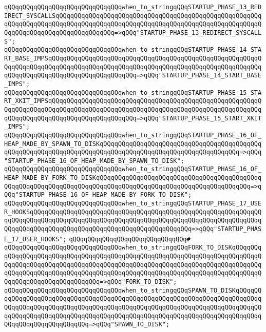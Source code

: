 \verb|qQQqqQQqqQQqqQQqqQQqqQQqqQQqqQQqwhen_to_stringqQQqSTARTUP_PHASE_13_REDIRECT_SYSCALLSqQQqqQQqqQQqqQQqqQQqqQQqqQQqqQQqqQQqqQQqqQQqqQQqqQQqqQQqqQQqqQQqqQQqqQQqqQQqqQQqqQQqqQQqqQQqqQQqqQQqqQQqqQQqqQQqqQQqqQQqqQQqqQQqqQQqqQQqqQQqqQQqqQQqqQQqqQQq=>qQQq"STARTUP_PHASE_13_REDIRECT_SYSCALLS";|\newline
\verb|qQQqqQQqqQQqqQQqqQQqqQQqqQQqqQQqwhen_to_stringqQQqSTARTUP_PHASE_14_START_BASE_IMPSqQQqqQQqqQQqqQQqqQQqqQQqqQQqqQQqqQQqqQQqqQQqqQQqqQQqqQQqqQQqqQQqqQQqqQQqqQQqqQQqqQQqqQQqqQQqqQQqqQQqqQQqqQQqqQQqqQQqqQQqqQQqqQQqqQQqqQQqqQQqqQQqqQQqqQQqqQQqqQQqqQQq=>qQQq"STARTUP_PHASE_14_START_BASE_IMPS";|\newline
\verb|qQQqqQQqqQQqqQQqqQQqqQQqqQQqqQQqwhen_to_stringqQQqSTARTUP_PHASE_15_START_XKIT_IMPSqQQqqQQqqQQqqQQqqQQqqQQqqQQqqQQqqQQqqQQqqQQqqQQqqQQqqQQqqQQqqQQqqQQqqQQqqQQqqQQqqQQqqQQqqQQqqQQqqQQqqQQqqQQqqQQqqQQqqQQqqQQqqQQqqQQqqQQqqQQqqQQqqQQqqQQqqQQqqQQqqQQq=>qQQq"STARTUP_PHASE_15_START_XKIT_IMPS";|\newline
\verb|qQQqqQQqqQQqqQQqqQQqqQQqqQQqqQQqwhen_to_stringqQQqSTARTUP_PHASE_16_OF_HEAP_MADE_BY_SPAWN_TO_DISKqQQqqQQqqQQqqQQqqQQqqQQqqQQqqQQqqQQqqQQqqQQqqQQqqQQqqQQqqQQqqQQqqQQqqQQqqQQqqQQqqQQqqQQqqQQqqQQqqQQqqQQqqQQq=>qQQq"STARTUP_PHASE_16_OF_HEAP_MADE_BY_SPAWN_TO_DISK";|\newline
\verb|qQQqqQQqqQQqqQQqqQQqqQQqqQQqqQQqwhen_to_stringqQQqSTARTUP_PHASE_16_OF_HEAP_MADE_BY_FORK_TO_DISKqQQqqQQqqQQqqQQqqQQqqQQqqQQqqQQqqQQqqQQqqQQqqQQqqQQqqQQqqQQqqQQqqQQqqQQqqQQqqQQqqQQqqQQqqQQqqQQqqQQqqQQqqQQqqQQq=>qQQq"STARTUP_PHASE_16_OF_HEAP_MADE_BY_FORK_TO_DISK";|\newline
\verb|qQQqqQQqqQQqqQQqqQQqqQQqqQQqqQQqwhen_to_stringqQQqSTARTUP_PHASE_17_USER_HOOKSqQQqqQQqqQQqqQQqqQQqqQQqqQQqqQQqqQQqqQQqqQQqqQQqqQQqqQQqqQQqqQQqqQQqqQQqqQQqqQQqqQQqqQQqqQQqqQQqqQQqqQQqqQQqqQQqqQQqqQQqqQQqqQQqqQQqqQQqqQQqqQQqqQQqqQQqqQQqqQQqqQQqqQQqqQQqqQQqqQQqqQQq=>qQQq"STARTUP_PHASE_17_USER_HOOKS";|\newline
\verb|qQQqqQQqqQQqqQQqqQQqqQQqqQQqqQQq#|\newline
\verb|qQQqqQQqqQQqqQQqqQQqqQQqqQQqqQQqwhen_to_stringqQQqFORK_TO_DISKqQQqqQQqqQQqqQQqqQQqqQQqqQQqqQQqqQQqqQQqqQQqqQQqqQQqqQQqqQQqqQQqqQQqqQQqqQQqqQQqqQQqqQQqqQQqqQQqqQQqqQQqqQQqqQQqqQQqqQQqqQQqqQQqqQQqqQQqqQQqqQQqqQQqqQQqqQQqqQQqqQQqqQQqqQQqqQQqqQQqqQQqqQQqqQQqqQQqqQQqqQQqqQQqqQQqqQQqqQQqqQQqqQQqqQQqqQQqqQQqqQQq=>qQQq"FORK_TO_DISK";|\newline
\verb|qQQqqQQqqQQqqQQqqQQqqQQqqQQqqQQqwhen_to_stringqQQqSPAWN_TO_DISKqQQqqQQqqQQqqQQqqQQqqQQqqQQqqQQqqQQqqQQqqQQqqQQqqQQqqQQqqQQqqQQqqQQqqQQqqQQqqQQqqQQqqQQqqQQqqQQqqQQqqQQqqQQqqQQqqQQqqQQqqQQqqQQqqQQqqQQqqQQqqQQqqQQqqQQqqQQqqQQqqQQqqQQqqQQqqQQqqQQqqQQqqQQqqQQqqQQqqQQqqQQqqQQqqQQqqQQqqQQqqQQqqQQqqQQqqQQqqQQq=>qQQq"SPAWN_TO_DISK";|\newline
